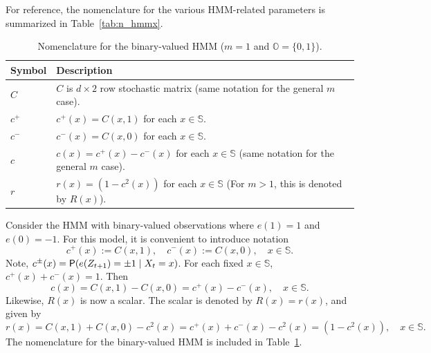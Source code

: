 \documentclass[twoside,11pt]{article}
\def\bS{\begin{slide}}
\def\bS{\mathbb{S}}
\def\bO{\mathbb{O}}
\def\sP{{\sf P}}
\begin{document}
For reference, the nomenclature for the various HMM-related parameters is summarized in Table~\ref{tab:n_hmmx}.

\begin{table}[t]
  \begin{tabularx}{\textwidth}{l l}
    \toprule
    Symbol & Description \\
    \midrule
    $C$ & $C$ is $d\times 2$ row stochastic matrix  (same notation for the general $m$ case).\\
    $c^+$ & $c^+(x) = C(x,1)$ for each $x\in\bS$. \\
    $c^-$ & $c^-(x) = C(x,0)$ for each $x\in\bS$. \\
    $c$ & $c(x) = c^+(x) - c^-(x)$ for each $x\in\bS$ (same notation for the general $m$ case). \\
    $r$ & $r(x) = (1-c^2(x))$ for each $x\in\bS$ (For $m>1$, this is denoted by $R(x)$).\\
    \bottomrule
  \end{tabularx}
  \vspace*{-10pt}
  \caption{Nomenclature for the binary-valued HMM ($m=1$ and $\bO=\{0,1\}$).}
  \label{tab:n_hmm_binary}
  \vspace*{-10pt}
\end{table}

\begin{example}[m=1]
  Consider the HMM with binary-valued observations where $e(1)=1$ and $e(0)=-1$.  
  For this model, it is convenient to introduce notation
  \begin{equation*}
    c^+(x) := C(x,1),\quad c^{-}(x) := C(x,0),\quad x\in \bS.
  \end{equation*}
  Note, $c^\pm(x)=\sP( e(Z_{t+1})=\pm 1 \mid X_t=x)$. 
  For each fixed $x\in\bS$, $c^+(x)+c^-(x) = 1$.  
  Then 
  \begin{equation*}
    c(x)=C(x,1) - C(x,0) = c^+(x)-c^-(x),\quad x\in\bS.
  \end{equation*}
  Likewise, $R(x)$ is now a scalar.
  The scalar is denoted by $R(x)=r(x)$, and given by
  \begin{equation*}
    r(x)= C(x,1) + C(x,0) - c^2(x)= c^+(x) + c^{-}(x) - c^2(x) = (1-c^2(x)),\quad x\in\bS.
  \end{equation*}
  The nomenclature for the binary-valued HMM is included in
  Table~\ref{tab:n_hmm_binary}. 
\end{example}
\end{document}
